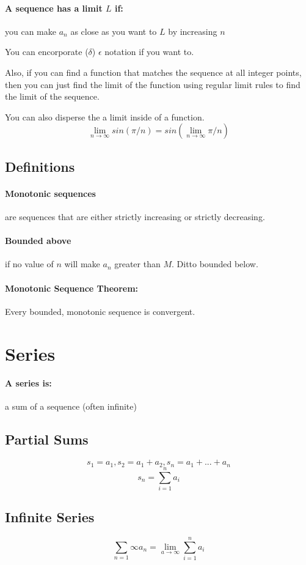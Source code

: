 \documentclass[a4paper,12pt]{report}
\begin{document}
\paragraph{A sequence has a limit $L$ if: } you can make $a_n$ as close as you want to $L$ by increasing $n$

You can encorporate ($\delta$) $\epsilon$ notation if you want to.

Also, if you can find a function that matches the sequence at all integer points, then you can just find the limit of the function using regular limit rules to find the limit of the sequence.

You can also disperse the a limit inside of a function.
$$\lim_{n \to \infty} sin(\pi/n) = sin( \lim_{n \to \infty} \pi /n )$$

\subsection{Definitions}
\paragraph{Monotonic sequences} are sequences that are either strictly increasing or strictly decreasing.
\paragraph{Bounded above} if no value of $n$ will make $a_n$ greater than $M$. Ditto bounded below.
\paragraph{Monotonic Sequence Theorem: } Every bounded, monotonic sequence is convergent.

\section{Series}
\paragraph{A series is: } a sum of a sequence (often infinite)
\subsection{Partial Sums}
$$s_1 = a_1, s_2 = a_1 + a_2, s_n = a_1 + ... + a_n$$
$$s_n = \sum_{i=1}^{n} a_i$$
\subsection{Infinite Series}
$$\sum_{n=1}{\infty} a_n = \lim_{a \to \infty} \sum_{i=1}^{n} a_i$$
\end{document}
